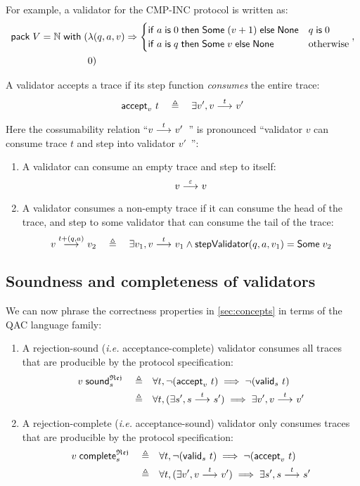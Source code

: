 For example, a validator for the CMP-INC protocol is written as:
\begin{align*}
  \mathsf{pack}\;V=\mathbb N\;\mathsf{with}\;(&\lambda(q,a,v)\Rightarrow
      \begin{cases}
        \mathsf{if}\; a\;\mathsf{is}\;0\;\mathsf{then}\;\mathsf{Some}\;(v+1)\;\mathsf{else}\;\mathsf{None}&q\;\mathsf{is}\;0\\
        \mathsf{if}\; a\;\mathsf{is}\; q\;\mathsf{then}\;\mathsf{Some}\;v\;\mathsf{else}\;\mathsf{None}&\mathrm{otherwise}
      \end{cases}
   ,\\
    &0)
\end{align*}

\begin{definition}
A validator accepts a trace if its step function {\em consumes} the entire
trace:
\[\mathsf{accept}_{v}~{t}\quad\triangleq\quad\exists v',v\overset{t}\longrightarrow_{} v'\]

Here the cossumability relation ``$v\overset{t}\longrightarrow_{} v'$~'' is pronounced ``validator
$v$ can consume trace $t$ and step into validator $v'$~'':
\begin{enumerate}
\item A validator can consume an empty trace and step to itself:
  \[v\overset{\varepsilon}\longrightarrow_{} v\]
\item A validator consumes a non-empty trace if it can consume the head of the
  trace, and step to some validator that can consume the tail of the trace:
  \[v\overset{t+(q,a)}\longrightarrow_{} v_2\quad\triangleq\quad\exists v_1,v\overset{t}\longrightarrow_{} v_1\wedge
  \mathsf{stepValidator} (q,a,v_1)=\mathsf{Some}\;v_2\]
\end{enumerate}
\end{definition}

\subsection{Soundness and completeness of validators}
We can now phrase the correctness properties in \autoref{sec:concepts} in terms
of the QAC language family:
\begin{enumerate}
  \item A rejection-sound ({\it i.e.} acceptance-complete) validator consumes
    all traces that are producible by the protocol specification:
    \begin{align*}
      v\;\mathsf{sound}_{s}^\mathfrak{Rej}\quad\triangleq\quad&\forall t,\neg(\mathsf{accept}_{v}~{t})\implies\neg(\mathsf{valid}_{s}~{t})\\
      \triangleq\quad&\forall t,(\exists s',s\overset{t}\longrightarrow_{} s')\implies\exists v',v\overset{t}\longrightarrow_{} v'
    \end{align*}
  \item A rejection-complete ({\it i.e.} acceptance-sound) validator only
    consumes traces that are producible by the protocol specification:
    \begin{align*}
      v\;\mathsf{complete}_{s}^\mathfrak{Rej}\quad\triangleq\quad&\forall t,\neg(\mathsf{valid}_{s}~{t})\implies\neg(\mathsf{accept}_{v}~{t})\\
      \triangleq\quad&\forall t,(\exists v',v\overset{t}\longrightarrow_{} v')\implies\exists s',s\overset{t}\longrightarrow_{} s'
    \end{align*}
\end{enumerate}

